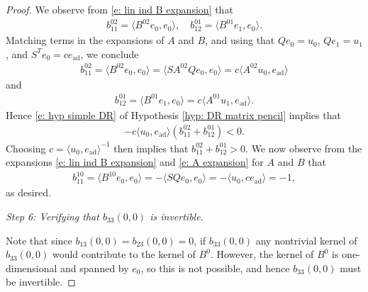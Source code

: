 \documentclass[11pt]{article}
\numberwithin{equation}{section}
\numberwithin{prop}{section}
\begin{document}
\begin{proof}
	We observe from \eqref{e: lin ind B expansion} that 
	\begin{align*}
	b_{11}^{02} = \langle B^{02} e_0, e_0 \rangle, \quad b_{12}^{01} = \langle B^{01} e_1, e_0 \rangle. 
	\end{align*}
	Matching terms in the expansions of $A$ and $B$, and using that $Q e_0 = u_0$, $Q e_1 = u_1$, and $S^T e_0 = c e_\mathrm{ad}$, we conclude 
	\begin{align*}
	b_{11}^{02} =  \langle B^{02} e_0, e_0 \rangle = \langle S A^{02} Q e_0, e_0 \rangle = c \langle A^{02} u_0, e_\mathrm{ad} \rangle 
	\end{align*}
	and 
	\begin{align*}
	b_{12}^{01} = \langle B^{01} e_1, e_0 \rangle = c\langle A^{01} u_1, e_\mathrm{ad} \rangle. 
	\end{align*}
	Hence \eqref{e: hyp simple DR} of Hypothesis \ref{hyp: DR matrix pencil} implies that 
	\begin{align*}
	- c \langle u_0, e_\mathrm{ad} \rangle (b_{11}^{02} + b_{12}^{01}) < 0. 
	\end{align*}
	Choosing $c = \langle u_0, e_\mathrm{ad} \rangle^{-1}$ then implies that $b_{11}^{02} + b_{12}^{01} > 0$. We now observe from the expansions \eqref{e: lin ind B expansion} and \eqref{e: A expansion} for $A$ and $B$ that 
	\begin{align*}
	b_{11}^{10} = \langle B^{10} e_0, e_0 \rangle = -\langle S Q e_0, e_0 \rangle = - \langle u_0, c e_\mathrm{ad} \rangle = -1,
	\end{align*}
	as desired. 
	
	\emph{Step 6: Verifying that $b_{33}(0,0)$ is invertible.} 
	
	Note that since $b_{13}(0,0) = b_{23}(0,0) = 0$, if $b_{33}(0,0)$ any nontrivial kernel of $b_{33}(0,0)$ would contribute to the kernel of $B^0$. However, the kernel of $B^0$ is one-dimensional and spanned by $e_0$, so this is not possible, and hence $b_{33}(0,0)$ must be invertible.
\end{proof}
\end{document}
